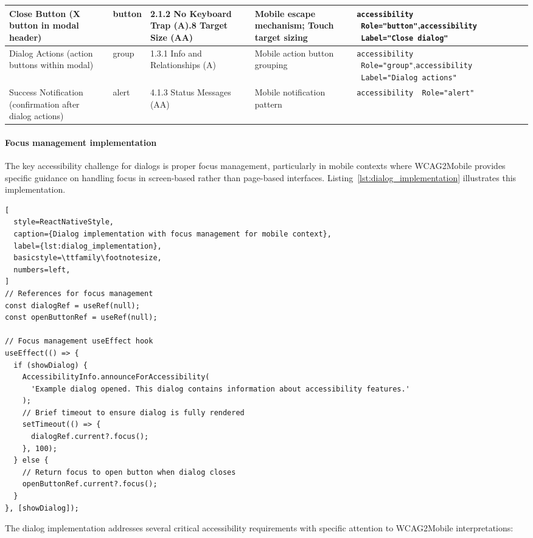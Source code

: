 \begin{longtable}[c]{|C{2.5cm}|C{2cm}|C{2.8cm}|C{2.8cm}|C{4.7cm}|}
\hline
Close Button (X button in modal header) & button & 2.1.2 No Keyboard Trap (A).8 Target Size (AA) & Mobile escape mechanism; Touch target sizing & \texttt{accessibility \ Role="button"},\newline \texttt{accessibility \ Label="Close dialog"} \\
\hline
Dialog Actions (action buttons within modal) & group & 1.3.1 Info and Relationships (A) & Mobile action button grouping & \texttt{accessibility \ Role="group"},\newline \texttt{accessibility \ Label="Dialog actions"} \\
\hline
Success Notification (confirmation after dialog actions) & alert & 4.1.3 Status Messages (AA) & Mobile notification pattern & \texttt{accessibility \ Role="alert"} \\
\end{longtable}
\FloatBarrier

\paragraph{Focus management implementation}

The key accessibility challenge for dialogs is proper focus management, particularly in mobile contexts where WCAG2Mobile provides specific guidance on handling focus in screen-based rather than page-based interfaces. Listing~\ref{lst:dialog_implementation} illustrates this implementation.

\begin{lstlisting}[
  style=ReactNativeStyle,
  caption={Dialog implementation with focus management for mobile context},
  label={lst:dialog_implementation},
  basicstyle=\ttfamily\footnotesize,
  numbers=left,
]
// References for focus management
const dialogRef = useRef(null);
const openButtonRef = useRef(null);

// Focus management useEffect hook
useEffect(() => {
  if (showDialog) {
    AccessibilityInfo.announceForAccessibility(
      'Example dialog opened. This dialog contains information about accessibility features.'
    );
    // Brief timeout to ensure dialog is fully rendered
    setTimeout(() => {
      dialogRef.current?.focus();
    }, 100);
  } else {
    // Return focus to open button when dialog closes
    openButtonRef.current?.focus();
  }
}, [showDialog]);
\end{lstlisting}
\FloatBarrier

The dialog implementation addresses several critical accessibility requirements with specific attention to WCAG2Mobile interpretations:

